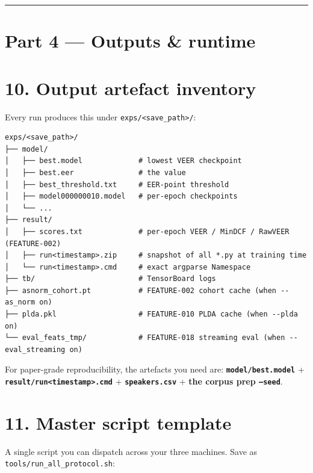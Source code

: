 \documentclass[10pt,a4paper]{article}
\begin{document}
\vspace{0.5em}\hrule\vspace{0.5em}

\section*{Part 4 --- Outputs \& runtime}

\section*{10. Output artefact inventory}

Every run produces this under \texttt{exps/<save\_path>/}:


\begin{Verbatim}[fontsize=\small,frame=single,framesep=4pt]
exps/<save_path>/
├── model/
│   ├── best.model             # lowest VEER checkpoint
│   ├── best.eer               # the value
│   ├── best_threshold.txt     # EER-point threshold
│   ├── model000000010.model   # per-epoch checkpoints
│   └── ...
├── result/
│   ├── scores.txt             # per-epoch VEER / MinDCF / RawVEER (FEATURE-002)
│   ├── run<timestamp>.zip     # snapshot of all *.py at training time
│   └── run<timestamp>.cmd     # exact argparse Namespace
├── tb/                        # TensorBoard logs
├── asnorm_cohort.pt           # FEATURE-002 cohort cache (when --as_norm on)
├── plda.pkl                   # FEATURE-010 PLDA cache (when --plda on)
└── eval_feats_tmp/            # FEATURE-018 streaming eval (when --eval_streaming on)
\end{Verbatim}


For paper-grade reproducibility, the artefacts you need are: \textbf{\texttt{model/best.model}} + \textbf{\texttt{result/run<timestamp>.cmd}} + \textbf{\texttt{speakers.csv}} + \textbf{the corpus prep \texttt{--seed}}.

\section*{11. Master script template}

A single script you can dispatch across your three machines. Save as \texttt{tools/run\_all\_protocol.sh}:
\end{document}

